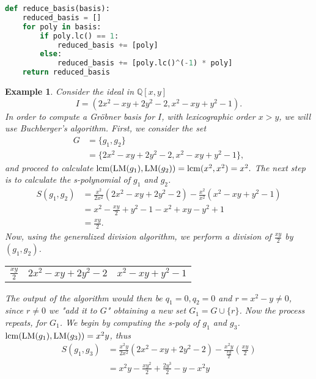 \documentclass[a4paper,12pt]{article}
\newtheorem{example}[theorem]{Example}
\newcommand{\QQ}{\mathbb{Q}}
\newcommand{\LM }{{\rm LM}}
\DeclareMathOperator{\lcm}{lcm}
\begin{document}
\begin{lstlisting}[language=Python, caption=Algorithm for reducing a Gr\"obner Basis]
def reduce_basis(basis):
	reduced_basis = []
	for poly in basis:
		if poly.lc() == 1:
			reduced_basis += [poly]
		else:
			reduced_basis += [poly.lc()^(-1) * poly]
	return reduced_basis
\end{lstlisting}
\begin{example}
	Consider the ideal in $\QQ[x,y]$
	$$ I = (2x^2-xy+2y^2-2, x^2-xy+y^2-1).$$
	In order to compute a Gr\"obner basis for $I$, with lexicographic order $x > y$, we will use Buchberger's algorithm.
	First, we consider the set \begin{equation*}
		\begin{split}
		G & =\{ g_1, g_2\} \\
		& = \{2x^2-xy+2y^2-2, x^2-xy+y^2-1\},
		\end{split}
	\end{equation*}
	and proceed to calculate $\lcm(\LM(g_1), \LM(g_2)) = \lcm(x^2, x^2) = x^2.$ The next step is to calculate the s-polynomial of $g_1$ and $g_2$.
	\begin{equation*}
		\begin{split}
		S(g_1, g_2) &= \frac{x^2}{2x^2}(2x^2-xy+2y^2-2)-\frac{x^2}{x^2} (x^2-xy+y^2-1) \\
		& = x^2 - \frac{xy}{2} + y^2 - 1 - x^2+ xy - y^2 +1 \\
		& = \frac{xy}{2}.
		\end{split}
	\end{equation*}
	Now, using the generalized division algorithm, we perform a division of $\frac{xy}{2}$ by $(g_1, g_2)$. 
	\begin{center}
			\begin{tabular}{l|l|l}
			$ \frac{xy}{2} $ & $ 2x^2-xy+2y^2-2$ & $ x^2-xy+y^2-1$ \\ \cline{2-3} 
		\end{tabular}
	\end{center}
The output of the algorithm would then be $q_1 = 0, q_2 = 0$ and $r = x^2-y \neq 0$, since $ r \neq 0$ we "add it to $G$" obtaining a new set $G_1 = G \cup \{r\}$. Now the process repeats, for $G_1$. We begin by computing the s-poly of $g_1$ and $g_3$. $\lcm(\LM(g_1), \LM(g_3)) = x^2y$, thus
\begin{equation*}
	\begin{split}
	S(g_1, g_3) & = \frac{x^2y}{2x^2} (2x^2-xy+2y^2-2) - \frac{x^2y}{\frac{xy}{2}}(\frac{xy}{2}) \\
	& = x^2y - \frac{xy^2}{2} + \frac{2y^3}{2} - y - x^2y \\

\end{split}
\end{equation*}
\end{example}
\end{document}
